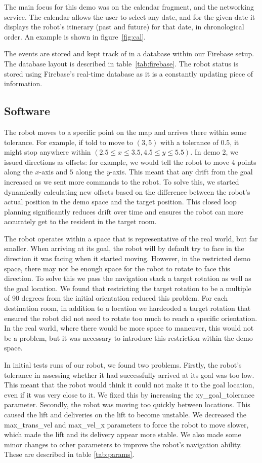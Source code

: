 \documentclass{article}
\begin{document}
The main focus for this demo was on the calendar fragment, and the networking service. The calendar allows the user to select any date, and for the given date it displays the robot's itinerary (past and future) for that date, in chronological order. An example is shown in figure~\ref{fig:cal}.

 The events are stored and kept track of in a database within our Firebase setup. The database layout is described in table~\ref{tab:firebase}. The robot status is stored using Firebase's real-time database as it is a constantly updating piece of information. 

\subsection{Software}
The robot moves to a specific point on the map and arrives there within some tolerance. For example, if told to move to $(3, 5)$ with a tolerance of $0.5$, it might stop anywhere within $(2.5 \leq x \leq 3.5, 4.5 \leq y \leq 5.5)$. In demo 2, we issued directions as offsets: for example, we would tell the robot to move $4$ points along the $x$-axis and $5$ along the $y$-axis. This meant that any drift from the goal increased as we sent more commands to the robot. To solve this, we started dynamically calculating new offsets based on the difference between the robot's actual position in the demo space and the target position. This closed loop planning significantly reduces drift over time and ensures the robot can more accurately get to the resident in the target room. 

The robot operates within a space that is representative of the real world, but far smaller. When arriving at its goal, the robot will by default try to face in the direction it was facing when it started moving. However, in the restricted demo space, there may not be enough space for the robot to rotate to face this direction. To solve this we pass the navigation stack a target rotation as well as the goal location. We found that restricting the target rotation to be a multiple of 90 degrees from the initial orientation reduced this problem. For each destination room, in addition to a location we hardcoded a target rotation that ensured the robot did not need to rotate too much to reach a specific orientation. In the real world, where there would be more space to maneuver, this would not be a problem, but it was necessary to introduce this restriction within the demo space.

In initial tests runs of our robot, we found two problems.
Firstly, the robot's tolerance in assessing whether it had successfully arrived at its goal was too low. This meant that the robot would think it could not make it to the goal location, even if it was very close to it. We fixed this by increasing the xy\_goal\_tolerance parameter.
Secondly, the robot was moving too quickly between locations. This caused the lift and deliveries on the lift to become unstable. We decreased the max\_trans\_vel and max\_vel\_x parameters to force the robot to move slower, which made the lift and its delivery appear more stable.
We also made some minor changes to other parameters to improve the robot's navigation ability. These are described in table \ref{tab:params}.  
\end{document}
